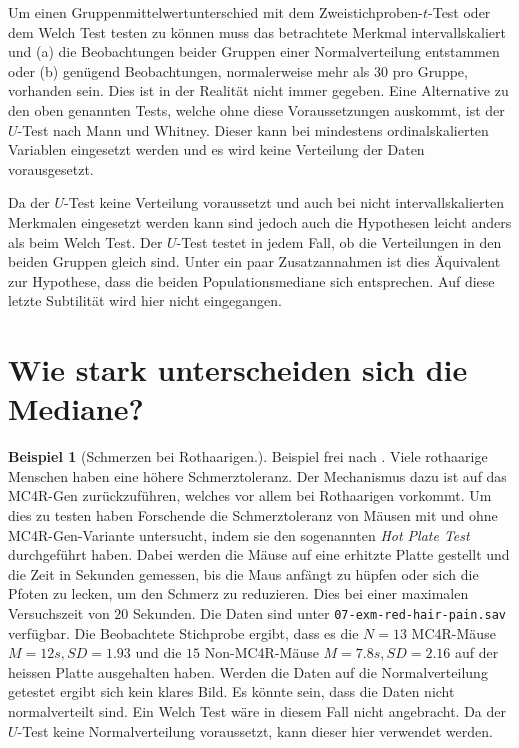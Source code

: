 \documentclass[
]{book}
\theoremstyle{definition}
\theoremstyle{definition}
\newtheorem{example}{Beispiel}[chapter]
\theoremstyle{definition}
\theoremstyle{definition}
\theoremstyle{remark}
\begin{document}
Um einen Gruppenmittelwertunterschied mit dem Zweistichproben-\(t\)-Test
oder dem Welch Test testen zu können muss das betrachtete Merkmal
intervallskaliert und (a) die Beobachtungen beider Gruppen einer
Normalverteilung entstammen oder (b) genügend Beobachtungen,
normalerweise mehr als \(30\) pro Gruppe, vorhanden sein. Dies ist in der
Realität nicht immer gegeben. Eine Alternative zu den oben genannten
Tests, welche ohne diese Voraussetzungen auskommt, ist der \(U\)-Test nach
Mann und Whitney. Dieser kann bei mindestens ordinalskalierten Variablen
eingesetzt werden und es wird keine Verteilung der Daten vorausgesetzt.

Da der \(U\)-Test keine Verteilung voraussetzt und auch bei nicht
intervallskalierten Merkmalen eingesetzt werden kann sind jedoch auch
die Hypothesen leicht anders als beim Welch Test. Der \(U\)-Test testet in
jedem Fall, ob die Verteilungen in den beiden Gruppen gleich sind. Unter
ein paar Zusatzannahmen ist dies Äquivalent zur Hypothese, dass die
beiden Populationsmediane sich entsprechen. Auf diese letzte Subtilität
wird hier nicht eingegangen.

\section{Wie stark unterscheiden sich die Mediane?}\label{wie-stark-unterscheiden-sich-die-mediane}

\begin{example}[Schmerzen bei Rothaarigen.]
\protect\hypertarget{exm:red-hair-pain}{}\label{exm:red-hair-pain}Beispiel frei nach \citet{robinson2021}. Viele rothaarige Menschen haben eine
höhere Schmerztoleranz. Der Mechanismus dazu ist auf das MC4R-Gen
zurückzuführen, welches vor allem bei Rothaarigen vorkommt. Um dies zu
testen haben Forschende die Schmerztoleranz von Mäusen mit und ohne
MC4R-Gen-Variante untersucht, indem sie den sogenannten \emph{Hot Plate Test}
durchgeführt haben. Dabei werden die Mäuse auf eine erhitzte Platte
gestellt und die Zeit in Sekunden gemessen, bis die Maus anfängt zu
hüpfen oder sich die Pfoten zu lecken, um den Schmerz zu reduzieren.
Dies bei einer maximalen Versuchszeit von \(20\) Sekunden. Die Daten sind
unter \texttt{07-exm-red-hair-pain.sav} verfügbar. Die
Beobachtete Stichprobe ergibt, dass es die \(N = 13\) MC4R-Mäuse
\(M = 12s, SD = 1.93\) und die \(15\) Non-MC4R-Mäuse \(M = 7.8s, SD = 2.16\)
auf der heissen Platte ausgehalten haben. Werden die Daten auf die
Normalverteilung getestet ergibt sich kein klares Bild. Es könnte sein,
dass die Daten nicht normalverteilt sind. Ein Welch Test wäre in diesem
Fall nicht angebracht. Da der \(U\)-Test keine Normalverteilung
voraussetzt, kann dieser hier verwendet werden.
\end{example}
\end{document}
